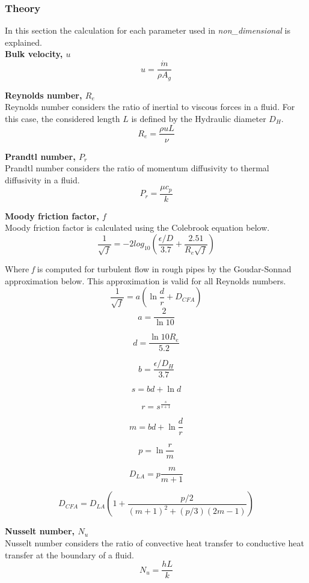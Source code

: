 \documentclass{article}
\begin{document}
\subsubsection{Theory}

In this section the calculation for each parameter used in \textit{non\_dimensional} is explained. \\

\textbf{Bulk velocity, $u$} \\
\[u=\frac{\dot{m}}{\rho A_{g}}\]

\textbf{Reynolds number, $R_{e}$} \\
Reynolds number considers the ratio of inertial to viscous forces in a fluid. For this case, the considered length $L$ is defined by the Hydraulic diameter $D_{H}$.
\[R_{e}=\frac{\rho u L}{\nu} \]

\textbf{Prandtl number, $P_{r}$} \\
Prandtl number considers the ratio of momentum diffusivity to thermal diffusivity in a fluid.
\[P_{r}=\frac{\mu c_{p}}{k} \]

\textbf{Moody friction factor, $f$} \\
Moody friction factor is calculated using the Colebrook equation below. \\

\[\frac{1}{\sqrt{f}} = -2log_{10}\left(\frac{\epsilon/D}{3.7}+\frac{2.51}{R_{e}\sqrt{f}}\right) \] 

Where \textit{f} is computed for turbulent flow in rough pipes by the Goudar-Sonnad approximation below. This approximation is valid for all Reynolds numbers.\\

\[\frac{1}{\sqrt{f}} = a\left(\ln{\frac{d}{r}}+D_{CFA}\right) \]
\[a = \frac{2}{\ln{10}}\]

\[d = \frac{\ln{10} R_{e}}{5.2}\]

\[b = \frac{\epsilon/D_{H}}{3.7}\]

\[s = bd + \ln{d}\]

\[r = s^{\frac{s}{s+1}}\]

\[m = bd + \ln{\frac{d}{r}}\]

\[p = \ln{\frac{r}{m}}\]

\[D_{LA} = p\frac{m}{m+1}\]

\[D_{CFA} = D_{LA}\left(1+\frac{p/2}{(m+1)^{2}+(p/3)(2m-1)}    \right)\] 

\textbf{Nusselt number, $N_{u}$} \\
Nusselt number considers the ratio of convective heat transfer to conductive heat transfer at the boundary of a fluid.
\[N_{u}=\frac{h L}{k} \]
\end{document}
